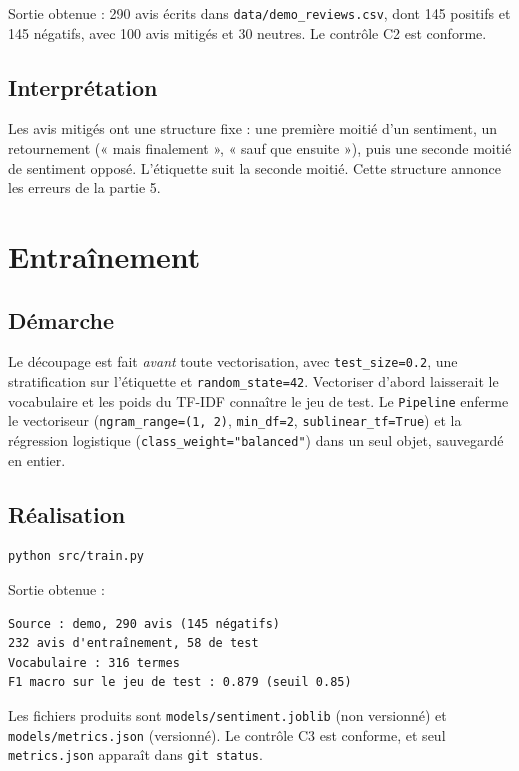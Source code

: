 \documentclass[11pt,a4paper]{article}
\begin{document}
Sortie obtenue : 290 avis écrits dans \texttt{data/demo\_reviews.csv}, dont 145 positifs et 145 négatifs, avec 100 avis mitigés et 30 neutres. Le contrôle C2 est conforme.

\subsection{Interprétation}

Les avis mitigés ont une structure fixe : une première moitié d'un sentiment, un retournement (« mais finalement », « sauf que ensuite »), puis une seconde moitié de sentiment opposé. L'étiquette suit la seconde moitié. Cette structure annonce les erreurs de la partie 5.

\section{Entraînement}

\subsection{Démarche}

Le découpage est fait \emph{avant} toute vectorisation, avec \texttt{test\_size=0.2}, une stratification sur l'étiquette et \texttt{random\_state=42}. Vectoriser d'abord laisserait le vocabulaire et les poids du TF-IDF connaître le jeu de test. Le \texttt{Pipeline} enferme le vectoriseur (\texttt{ngram\_range=(1, 2)}, \texttt{min\_df=2}, \texttt{sublinear\_tf=True}) et la régression logistique (\texttt{class\_weight="balanced"}) dans un seul objet, sauvegardé en entier.

\subsection{Réalisation}

\begin{verbatim}
python src/train.py
\end{verbatim}

Sortie obtenue :
\begin{verbatim}
Source : demo, 290 avis (145 négatifs)
232 avis d'entraînement, 58 de test
Vocabulaire : 316 termes
F1 macro sur le jeu de test : 0.879 (seuil 0.85)
\end{verbatim}

Les fichiers produits sont \texttt{models/sentiment.joblib} (non versionné) et \texttt{models/metrics.json} (versionné). Le contrôle C3 est conforme, et seul \texttt{metrics.json} apparaît dans \texttt{git status}.
\end{document}
